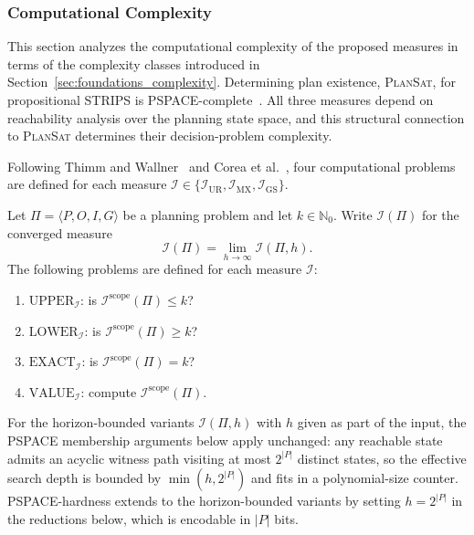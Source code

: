 \subsubsection{Computational Complexity}
\label{sec:complexity}

This section analyzes the computational complexity of the proposed measures in terms of the complexity classes introduced in Section~\ref{sec:foundations_complexity}. Determining plan existence, \textsc{PlanSat}, for propositional \ac{STRIPS} is PSPACE-complete~\cite{Bylander1994}. All three measures depend on reachability analysis over the planning state space, and this structural connection to \textsc{PlanSat} determines their decision-problem complexity.

Following Thimm and Wallner~\cite{Thimm2016} and Corea et al.~\cite{Corea2022}, four computational problems are defined for each measure $\mathcal{I} \in \{\mathcal{I}_{\text{UR}}, \mathcal{I}_{\text{MX}}, \mathcal{I}_{\text{GS}}\}$.

\begin{defn}
    \label{defn:decision_problems}
    Let $\Pi = \langle P, O, I, G \rangle$ be a planning problem and let $k \in \mathbb{N}_0$. Write $\mathcal{I}(\Pi)$ for the converged measure
    \begin{equation*}
        \mathcal{I}(\Pi) = \lim_{h \to \infty} \mathcal{I}(\Pi, h).
    \end{equation*}
    The following problems are defined for each measure $\mathcal{I}$:
    \begin{enumerate}
        \item $\text{UPPER}_{\mathcal{I}}$: is $\mathcal{I}^{\text{scope}}(\Pi) \leq k$?
        \item $\text{LOWER}_{\mathcal{I}}$: is $\mathcal{I}^{\text{scope}}(\Pi) \geq k$?
        \item $\text{EXACT}_{\mathcal{I}}$: is $\mathcal{I}^{\text{scope}}(\Pi) = k$?
        \item $\text{VALUE}_{\mathcal{I}}$: compute $\mathcal{I}^{\text{scope}}(\Pi)$.
    \end{enumerate}
    For the horizon-bounded variants $\mathcal{I}(\Pi, h)$ with $h$ given as part of the input, the PSPACE membership arguments below apply unchanged: any reachable state admits an acyclic witness path visiting at most $2^{|P|}$ distinct states, so the effective search depth is bounded by $\min(h, 2^{|P|})$ and fits in a polynomial-size counter. \linebreak PSPACE-hardness extends to the horizon-bounded variants by setting $h = 2^{|P|}$ in the reductions below, which is encodable in $|P|$ bits.
\end{defn}

